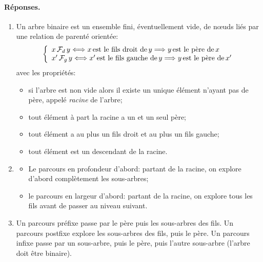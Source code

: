 \paragraph{Réponses.}

\begin{enumerate}

  \item Un arbre binaire est un ensemble fini, éventuellement vide, de
    n{\oe}uds liés par une relation de parenté orientée:
    \[
    \left\{
      \begin{array}{l}
        x \, {\cal F}_d \, y \Longleftrightarrow x \, \textnormal{est
          le fils droit de} \, y \Longrightarrow y \, \textnormal{est le
          père de} \, x \\
        x' \, {\cal F}_g \, y \Longleftrightarrow x' \,
        \textnormal{est le fils gauche de} \, y \Longrightarrow y \,
        \textnormal{est le père de} \, x'
      \end{array}
      \right.
    \]
    avec les propriétés:
    \begin{itemize}

     \item si l'arbre est non vide alors il existe un unique élément
       n'ayant pas de père, appelé \emph{racine} de l'arbre;

     \item tout élément à part la racine a un et un seul père;

     \item tout élément a au plus un fils droit et au plus un fils
       gauche;

     \item tout élément est un descendant de la racine.

   \end{itemize}

  \item
    \begin{itemize}

      \item Le parcours en profondeur d'abord: partant de la racine,
        on explore d'abord complètement les sous-arbres;

      \item le parcours en largeur d'abord: partant de la racine, on
        explore tous les fils avant de passer au niveau suivant.

    \end{itemize}

  \item Un parcours préfixe passe par le père puis les sous-arbres des
    fils. Un parcours postfixe explore les sous-arbres des fils, puis
    le père. Un parcours infixe passe par un sous-arbre, puis le père,
    puis l'autre sous-arbre (l'arbre doit être binaire).


\end{enumerate}
